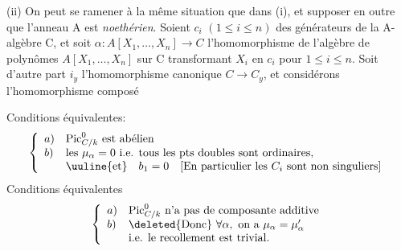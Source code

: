 (ii) On peut se ramener à la même situation que dans (i), et supposer en outre que l'anneau A est \textit{noethérien}. Soient $c_i$ $(1\leq i\leq n)$ des générateurs de la A-algèbre C, et soit $\alpha:A[X_1,\ldots,X_n]\to C$ l'homomorphisme de l'algèbre de polynômes $A[X_1,\ldots,X_n]$ sur C transformant $X_i$ en $c_i$ pour $1\leq i\leq n$. Soit d'autre part $i_y$ l'homomorphisme canonique $C\to C_y$, et considérons l'homomorphisme composé

Conditions équivalentes:
\[
\left\{\begin{array}{ll}
a)&\mathrm{Pic}_{C/k}^0\text{ est abélien}\\
b)&\text{les }\mu_\alpha=0\text{ i.e. tous les pts doubles sont ordinaires,}\\
&\uuline{\text{et}}\quad b_1=0\quad[\text{En particulier les }C_i\text{ sont non singuliers}]
\end{array}\right.
\]
Conditions équivalentes
\[
\left\{\begin{array}{ll}
a)&\mathrm{Pic}_{C/k}^0\text{ n'a pas de composante additive}\\
b)&\deleted{\text{Donc}}\ \forall\alpha,\text{ on a }\mu_\alpha=\mu'_\alpha\\
&\text{i.e. le recollement est trivial.}
\end{array}\right.
\]
